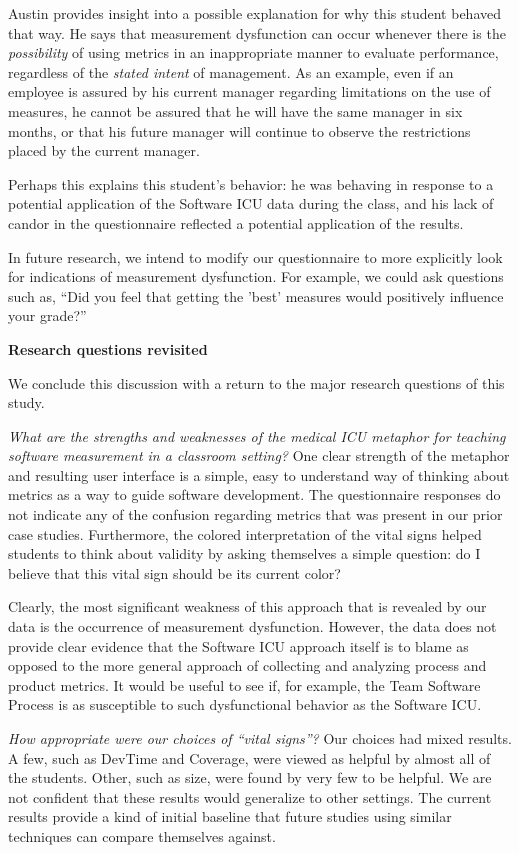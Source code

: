 \documentclass{acm_proc_article-sp}
\begin{document}
Austin provides insight into a possible explanation for why this student
behaved that way.  He says that measurement dysfunction can occur whenever
there is the {\em possibility} of using metrics in an inappropriate manner
to evaluate performance, regardless of the {\em stated intent} of
management.  As an example, even if an employee is assured by his current
manager regarding limitations on the use of measures, he cannot be assured
that he will have the same manager in six months, or that his future
manager will continue to observe the restrictions placed by the current
manager.

Perhaps this explains this student's behavior: he was behaving in response
to a potential application of the Software ICU data during the class, and
his lack of candor in the questionnaire reflected a potential application
of the results.

In future research, we intend to modify our questionnaire to more
explicitly look for indications of measurement dysfunction.  For example,
we could ask questions such as, ``Did you feel that getting the 'best'
measures would positively influence your grade?''

{\bf Research questions revisited}

We conclude this discussion with a return to the major research questions of this study. 

{\em What are the strengths and weaknesses of the medical ICU metaphor
for teaching software measurement in a classroom setting?}  One clear
strength of the metaphor and resulting user interface is a simple, easy to
understand way of thinking about metrics as a way to guide software
development.  The questionnaire responses do not indicate any of the
confusion regarding metrics that was present in our prior case studies.
Furthermore, the colored interpretation of the vital signs helped students
to think about validity by asking themselves a simple question: do I believe
that this vital sign should be its current color?  

Clearly, the most significant weakness of this approach that is revealed by
our data is the occurrence of measurement dysfunction. However, the data
does not provide clear evidence that the Software ICU approach itself is to
blame as opposed to the more general approach of collecting and analyzing
process and product metrics.  It would be useful to see if, for example,
the Team Software Process is as susceptible to such dysfunctional behavior
as the Software ICU.

{\em How appropriate were our choices of ``vital signs''?} Our choices had
mixed results.  A few, such as DevTime and Coverage, were viewed as helpful
by almost all of the students.  Other, such as size, were found by very few
to be helpful.  We are not confident that these results would generalize to
other settings.  The current results provide a kind of initial baseline
that future studies using similar techniques can compare themselves
against.
\end{document}
